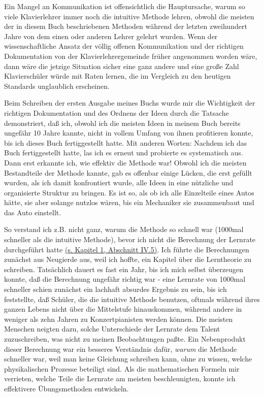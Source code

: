 Ein Mangel an Kommunikation ist offensichtlich die Hauptursache, warum so viele Klavierlehrer immer noch die intuitive Methode lehren, obwohl die meisten der in diesem Buch beschriebenen Methoden während der letzten zweihundert Jahre von dem einen oder anderen Lehrer gelehrt wurden.
Wenn der wissenschaftliche Ansatz der völlig offenen Kommunikation und der richtigen Dokumentation von der Klavierlehrergemeinde früher angenommen worden wäre, dann wäre die jetzige Situation sicher eine ganz andere und eine große Zahl Klavierschüler würde mit Raten lernen, die im Vergleich zu den heutigen Standards unglaublich erscheinen.

Beim Schreiben der ersten Ausgabe meines Buchs wurde mir die Wichtigkeit der richtigen Dokumentation und des Ordnens der Ideen durch die Tatsache demonstriert, daß ich, obwohl ich die meisten Ideen in meinem Buch bereits ungefähr 10 Jahre kannte, nicht in vollem Umfang von ihnen profitieren konnte, bis ich dieses Buch fertiggestellt hatte.
Mit anderen Worten: Nachdem ich das Buch fertiggestellt hatte, las ich es erneut und probierte es systematisch aus.
Dann erst erkannte ich, wie effektiv die Methode war!
Obwohl ich die meisten Bestandteile der Methode kannte, gab es offenbar einige Lücken, die erst gefüllt wurden, als ich damit konfrontiert wurde, alle Ideen in eine nützliche und organisierte Struktur zu bringen.
Es ist so, als ob ich alle Einzelteile eines Autos hätte, sie aber solange nutzlos wären, bis ein Mechaniker sie zusammenbaut und das Auto einstellt.

So verstand ich z.B. nicht ganz, warum die Methode so schnell war (1000mal schneller als die intuitive Methode), bevor ich nicht die Berechnung der Lernrate durchgeführt hatte \hyperref[c1iv5]{(s. Kapitel 1, Abschnitt IV.5)}.
Ich führte die Berechnungen zunächst aus Neugierde aus, weil ich hoffte, ein Kapitel über die Lerntheorie zu schreiben.
Tatsächlich dauert es fast ein Jahr, bis ich mich selbst überzeugen konnte, daß die Berechnung ungefähr richtig war - eine Lernrate von 1000mal schneller schien zunächst ein lachhaft absurdes Ergebnis zu sein, bis ich feststellte, daß Schüler, die die intuitive Methode benutzen, oftmals während ihres ganzen Lebens nicht über die Mittelstufe hinauskommen, während andere in weniger als zehn Jahren zu Konzertpianisten werden können.
Die meisten Menschen neigten dazu, solche Unterschiede der Lernrate dem Talent zuzuschreiben, was nicht zu meinen Beobachtungen paßte.
Ein Nebenprodukt dieser Berechnung war ein besseres Verständnis dafür, \textit{warum} die Methode schneller war, weil man keine Gleichung schreiben kann, ohne zu wissen, welche physikalischen Prozesse beteiligt sind.
Als die mathematischen Formeln mir verrieten, welche Teile die Lernrate am meisten beschleunigten, konnte ich effektivere Übungsmethoden entwickeln.

